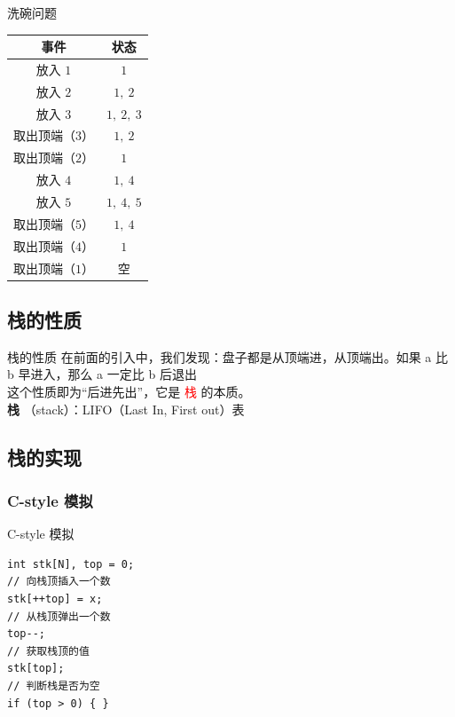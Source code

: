 \documentclass{beamer}
\begin{document}
\begin{frame}{洗碗问题}
    \begin{center}
    \begin{tabular}{cc}
        \toprule
        事件 & 状态 \\
        \hline
        放入 $1$ & $1$ \\
        放入 $2$ & $1, \ 2$ \\
        放入 $3$ & $1, \ 2, \ 3$ \\
        取出顶端（$3$）& $1, \ 2$ \\
        取出顶端（$2$） & $1$ \\
        放入 $4$ & $1, \ 4$ \\
        放入 $5$ & $1, \ 4, \ 5$ \\
        取出顶端（$5$） & $1, \ 4$ \\
        取出顶端（$4$） & $1$ \\
        取出顶端（$1$） & 空 \\
        \bottomrule
    \end{tabular}
    \end{center}
\end{frame}

\subsection{栈的性质}
\begin{frame}{栈的性质}
    在前面的引入中，我们发现：盘子都是从顶端进，从顶端出。如果 a 比 b 早进入，那么 a 一定比 b 后退出\\

    这个性质即为“后进先出”，它是 \textcolor{red}{栈} 的本质。 \\

    \textbf{栈} （stack）：LIFO（Last In, First out）表 \\
\end{frame}

\subsection{栈的实现}
\subsubsection{C-style 模拟}
\begin{frame}[fragile]{C-style 模拟}
    \begin{verbatim}
int stk[N], top = 0;
// 向栈顶插入一个数
stk[++top] = x;
// 从栈顶弹出一个数
top--;
// 获取栈顶的值
stk[top];
// 判断栈是否为空
if (top > 0) { }
    \end{verbatim}
\end{frame}
\end{document}
